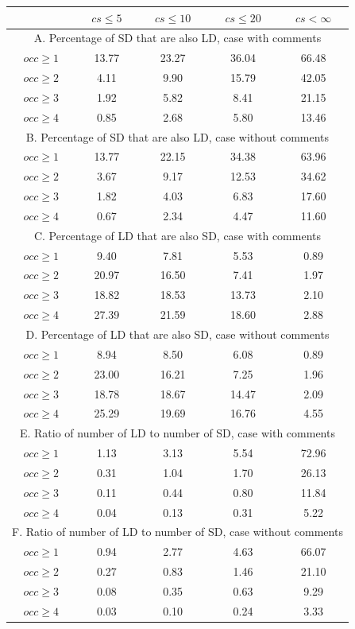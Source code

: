 \documentclass[conference]{IEEEtran}
\begin{document}
\begin{table}[!h]
\begin{tabular}{|c|c|c|c|c|}
\hline
	      &	$cs\leq 5$	&	$cs\leq 10$	&	$cs\leq 20$	&	$cs< \infty$	\\
\hline
\multicolumn{5}{c}{A. Percentage of SD that are also LD, case with comments}\\
\hline
$occ\geq 1$	&	13.77	&	23.27	&	36.04	&	66.48	\\
$occ\geq 2$	&	4.11	&	9.90	&	15.79	&	42.05	\\
$occ\geq 3$	&	1.92	&	5.82	&	8.41	&	21.15	\\
$occ\geq 4$	&	0.85	&	2.68	&	5.80	&	13.46	\\
\hline
\multicolumn{5}{c}{B. Percentage of SD that are also LD, case without comments}\\
\hline
$occ\geq 1$	&	13.77	&	22.15	&	34.38	&	63.96	\\
$occ\geq 2$	&	3.67	&	9.17	&	12.53	&	34.62	\\
$occ\geq 3$	&	1.82	&	4.03	&	6.83	&	17.60	\\
$occ\geq 4$	&	0.67	&	2.34	&	4.47	&	11.60	\\
\hline
\multicolumn{5}{c}{C. Percentage of LD that are also SD, case with comments}\\
\hline
$occ\geq 1$	&	9.40	&	7.81	&	5.53	&	0.89	\\
$occ\geq 2$	&	20.97	&	16.50	&	7.41	&	1.97	\\
$occ\geq 3$&	18.82	&	18.53	&	13.73	&	2.10	\\
$occ\geq 4$&	27.39	&	21.59	&	18.60	&	2.88	\\
\hline
\multicolumn{5}{c}{D. Percentage of LD that are also SD, case without comments}\\
\hline
$occ\geq 1$	&	8.94	&	8.50	&	6.08	&	0.89	\\
$occ\geq 2$	&	23.00	&	16.21	&	7.25	&	1.96	\\
$occ\geq 3$	&	18.78	&	18.67	&	14.47	&	2.09	\\
$occ\geq 4$	&	25.29	&	19.69	&	16.76	&	4.55	\\
\hline
\multicolumn{5}{c}{E. Ratio of number of LD to number of SD, case with comments}\\
\hline
$occ\geq 1$	&	1.13	&	3.13	&	5.54	&	72.96	\\
$occ\geq 2$	&	0.31	&	1.04	&	1.70	&	26.13	\\
$occ\geq 3$	&	0.11	&	0.44	&	0.80	&	11.84	\\
$occ\geq 4$	&	0.04	&	0.13	&	0.31	&	5.22	\\
\hline
\multicolumn{5}{c}{F. Ratio of number of LD to number of SD, case without comments}\\
\hline
$occ\geq 1$	&	0.94	&	2.77	&	4.63	&	66.07	\\
$occ\geq 2$	&	0.27	&	0.83	&	1.46	&	21.10	\\
$occ\geq 3$	&	0.08	&	0.35	&	0.63	&	9.29	\\
$occ\geq 4$	&	0.03	&	0.10	&	0.24	&	3.33	\\
\hline
\end{tabular}
\end{table}
\end{document}

